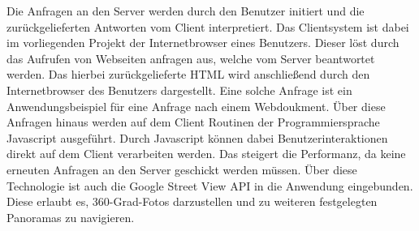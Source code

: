 Die Anfragen an den Server werden durch den Benutzer initiert und die
zurückgelieferten Antworten vom Client interpretiert. Das Clientsystem ist dabei
im vorliegenden Projekt der Internetbrowser eines Benutzers. Dieser löst durch das
Aufrufen von Webseiten anfragen aus, welche vom Server beantwortet werden. Das
hierbei zurückgelieferte HTML wird anschließend durch den Internetbrowser des
Benutzers dargestellt. Eine solche Anfrage ist ein Anwendungsbeispiel für eine
Anfrage nach einem Webdoukment. Über diese Anfragen hinaus werden auf dem Client
Routinen der Programmiersprache Javascript ausgeführt. Durch Javascript können dabei
Benutzerinteraktionen direkt auf dem Client verarbeiten werden. Das steigert die
Performanz, da keine erneuten Anfragen an den Server geschickt werden müssen.
Über diese Technologie ist auch die Google Street View API in die
Anwendung eingebunden. Diese erlaubt es, 360-Grad-Fotos darzustellen und zu
weiteren festgelegten Panoramas zu navigieren.